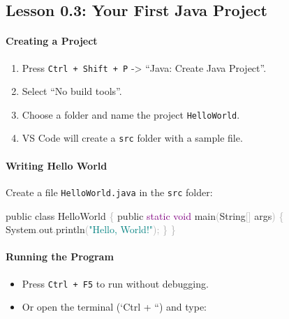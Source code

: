 \documentclass[
  justified,
  openright,
]{tufte-book}
\let\subsubsection\paragraph
\let\paragraph\paragraph
\newcommand{\BuiltInTok}[1]{#1}
\newcommand{\DataTypeTok}[1]{\textcolor{Purple}{#1}}
\newcommand{\FunctionTok}[1]{\textcolor{BrandBlue}{#1}}
\newcommand{\KeywordTok}[1]{\textcolor{BrandBlue}{#1}}
\newcommand{\NormalTok}[1]{#1}
\newcommand{\OperatorTok}[1]{\textcolor{DarkGray}{#1}}
\newcommand{\StringTok}[1]{\textcolor{Teal}{#1}}
\newenvironment{Shaded}{%
  \begin{snugshade}
}{%
  \end{snugshade}
}
\let\subsubsection\paragraph
\let\paragraph\paragraph
\providecommand{\tightlist}{%
  \setlength{\itemsep}{0pt}\setlength{\parskip}{0pt}}
\begin{document}
\subsection{Lesson 0.3: Your First Java
Project}\label{lesson-0.3-your-first-java-project}

\subsubsection{Creating a Project}\label{creating-a-project}

\begin{enumerate}
\def\labelenumi{\arabic{enumi}.}
\tightlist
\item
  Press \texttt{Ctrl\ +\ Shift\ +\ P} -\textgreater{} ``Java: Create
  Java Project''.
\item
  Select ``No build tools''.
\item
  Choose a folder and name the project \texttt{HelloWorld}.
\item
  VS Code will create a \texttt{src} folder with a sample file.
\end{enumerate}

\subsubsection{Writing Hello World}\label{writing-hello-world}

Create a file \texttt{HelloWorld.java} in the \texttt{src} folder:

\begin{Shaded}
\begin{Highlighting}[]
\KeywordTok{public} \KeywordTok{class}\NormalTok{ HelloWorld }\OperatorTok{\{}
    \KeywordTok{public} \DataTypeTok{static} \DataTypeTok{void} \FunctionTok{main}\OperatorTok{(}\BuiltInTok{String}\OperatorTok{[]}\NormalTok{ args}\OperatorTok{)} \OperatorTok{\{}
        \BuiltInTok{System}\OperatorTok{.}\FunctionTok{out}\OperatorTok{.}\FunctionTok{println}\OperatorTok{(}\StringTok{"Hello, World!"}\OperatorTok{);}
    \OperatorTok{\}}
\OperatorTok{\}}
\end{Highlighting}
\end{Shaded}

\subsubsection{Running the Program}\label{running-the-program}

\begin{itemize}
\tightlist
\item
  Press \texttt{Ctrl\ +\ F5} to run without debugging.
\item
  Or open the terminal (`Ctrl + ``) and type:
\end{itemize}
\end{document}
